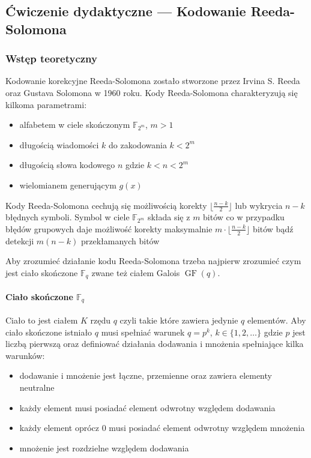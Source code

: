 \subsection{Ćwiczenie dydaktyczne --- Kodowanie Reeda-Solomona}

\subsubsection{Wstęp teoretyczny}
Kodowanie korekcyjne Reeda-Solomona zostało stworzone przez Irvina S. Reeda
oraz Gustava Solomona w 1960 roku.
Kody Reeda-Solomona charakteryzują się kilkoma parametrami:
\begin{itemize}
    \item alfabetem w ciele skończonym $\mathbb{F}_{2^m}$, $m>1$
    \item długością wiadomości $k$ do zakodowania $k < 2^{m}$
    \item długością słowa kodowego $n$ gdzie $k < n < 2^{m}$
    \item wielomianem generującym $g(x)$
\end{itemize}

Kody Reeda-Solomona cechują się możliwością korekty $\lfloor \frac{n-k}{2} \rfloor$
lub wykrycia $n-k$ błędnych symboli. Symbol w ciele $\mathbb{F}_{2^m}$ składa się
z $m$ bitów co w przypadku błędów grupowych daje możliwość korekty maksymalnie
$m \cdot \lfloor \frac{n-k}{2} \rfloor$ bitów bądź detekcji $m(n-k)$ przekłamanych bitów

Aby zrozumieć działanie kodu Reeda-Solomona trzeba najpierw zrozumieć
czym jest ciało skończone $\mathbb{F}_q$ zwane też ciałem Galois $\operatorname{GF}(q)$.

\paragraph{Ciało skończone $\mathbb{F}_q$}

Ciało to jest ciałem $K$ rzędu $q$ czyli takie które zawiera jedynie $q$ elementów. Aby ciało skończone istniało $q$ musi spełniać warunek $q=p^k$, $k \in \{ 1, 2, \ldots \}$ gdzie $p$ jest liczbą pierwszą oraz definiować działania dodawania i mnożenia spełniające kilka warunków:
\begin{itemize}
    \item dodawanie i mnożenie jest łączne, przemienne oraz zawiera elementy neutralne
    \item każdy element musi posiadać element odwrotny względem dodawania
    \item każdy element oprócz $0$ musi posiadać element odwrotny względem mnożenia
    \item mnożenie jest rozdzielne względem dodawania
\end{itemize}

